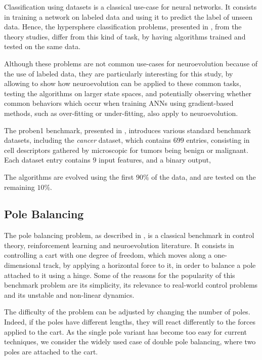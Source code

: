 Classification using datasets is a classical use-case for neural networks. It consists in training a network on labeled data and using it to
predict the label of unseen data. Hence, the hypersphere classification problems, presented in , from the
theory studies, differ from this kind of task, by having algorithms trained and tested on the same data.

Although these problems are not common use-cases for neuroevolution because of the use of labeled data,
they are particularly interesting for this study, by allowing to show how neuroevolution can be applied to these common tasks, testing
the algorithms on larger state spaces, and potentially observing whether common behaviors which occur when training ANNs using gradient-based methods,
such as over-fitting or under-fitting, also apply to neuroevolution.

The proben1 benchmark, presented in \cite{proben}, introduces various standard benchmark datasets, including the \textit{cancer} dataset, which
contains $699$ entries, consisting in cell descriptors gathered by microscopic for tumors being benign or malignant.
Each dataset entry contains $9$ input features, and a binary output,

The algorithms are evolved using the first $90\%$ of the data, and are tested on the remaining $10\%$.

\subsection{Pole Balancing}

The pole balancing problem, as described in \cite{pole_balancing}, is a classical benchmark in control theory, reinforcement learning and neuroevolution literature.
It consists in controlling a cart with one degree of freedom, which moves along a one-dimensional track, by applying a horizontal force to it, in order to balance a pole attached to it using a hinge.
Some of the reasons for the popularity of this benchmark problem are its simplicity, its relevance to real-world control problems and its unstable and non-linear dynamics.


The difficulty of the problem can be adjusted by changing the number of poles. Indeed, if the poles have different lengths, they will react differently to the forces applied to the cart.
As the single pole variant has become too easy for current techniques, we consider the widely used case of double pole balancing, where two poles are attached to the cart.

